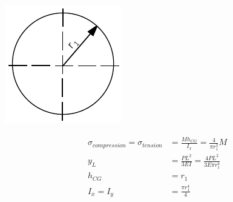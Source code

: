   \noindent\begin{minipage}{0.2\textwidth}%
      \includegraphics[width=\linewidth]{figures/profile_tube.pdf}
  \end{minipage}%
  \hfill%
  \begin{minipage}{0.8\textwidth}
    \begin{equation}
    \begin{aligned}
      \sigma _{compression} = \sigma _{tension} &= \frac{M h_{CG}}{I_x} = \frac{4}{\pi r_1 ^3} M\\
      y_L &= \frac{P L^2}{3EI} = \frac{4 P L^2}{3 E \pi r_1 ^4}\\
      h_{CG} &= r_1 \\
      I_x = I_y &= \frac{\pi r_1 ^4}{4}
      \end{aligned}
    \end{equation}
  \end{minipage}

